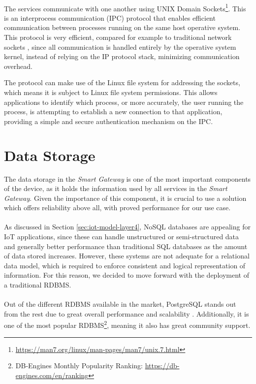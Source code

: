 \paragraph{} The services communicate with one another using UNIX Domain Sockets\footnote{\url{https://man7.org/linux/man-pages/man7/unix.7.html}}. This is an interprocess communication (\acs{IPC}) protocol that enables efficient communication between processes running on the same host operative system. This protocol is very efficient, compared for example to traditional network sockets \cite{Wright2007}, since all communication is handled entirely by the operative system kernel, instead of relying on the \acs{IP} protocol stack, minimizing communication overhead. 

The protocol can make use of the Linux file system for addressing the sockets, which means it is subject to Linux file system permissions. This allows applications to identify which process, or more accurately, the user running the process, is attempting to establish a new connection to that application, providing a simple and secure authentication mechanism on the \acs{IPC}.

\section{Data Storage}

The data storage in the \textit{Smart Gateway} is one of the most important components of the device, as it holds the information used by all services in the \textit{Smart Gateway}. Given the importance of this component, it is crucial to use a solution which offers reliability above all, with proved performance for our use case.  

\paragraph{} As discussed in Section \ref{sec:iot-model-layer4}, No\acs{SQL} databases are appealing for \acs{IoT} applications, since these can handle unstructured or semi-structured data and generally better performance than traditional \acs{SQL} databases as the amount of data stored increases. However, these systems are not adequate for a relational data model, which is required to enforce consistent and logical representation of information. For this reason, we decided to move forward with the deployment of a traditional \acs{RDBMS}.

\paragraph{} Out of the different \acs{RDBMS} available in the market, PostgreSQL stands out from the rest due to great overall performance and scalability \cite{Asiminidis2018}. Additionally, it is one of the most popular \acs{RDBMS}\footnote{DB-Engines Monthly Popularity Ranking: \url{https://db-engines.com/en/ranking}}, meaning it also has great community support. 

